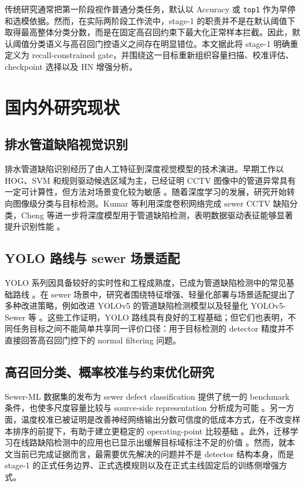 \documentclass[UTF8,openany,12pt]{ctexbook}
\newcommand{\formalmetric}[1]{\texttt{#1}}
\begin{document}
传统研究通常把第一阶段视作普通分类任务，默认以 Accuracy 或 \formalmetric{top1} 作为早停和选模依据。然而，在实际两阶段工作流中，stage-1 的职责并不是在默认阈值下取得最高整体分类分数，而是在固定高召回约束下最大化正常样本拦截。因此，默认阈值分类语义与高召回门控语义之间存在明显错位。本文据此将 stage-1 明确重定义为 recall-constrained gate，并围绕这一目标重新组织容量扫描、校准评估、checkpoint 选择以及 HN 增强分析。

\section{国内外研究现状}
\subsection{排水管道缺陷视觉识别}
排水管道缺陷识别经历了由人工特征到深度视觉模型的技术演进。早期工作以 HOG、SVM 和规则驱动候选区域为主，已经证明 CCTV 图像中的管道异常具有一定可计算性，但方法对场景变化较为敏感 \cite{halfawy2014hogsvm}。随着深度学习的发展，研究开始转向图像级分类与目标检测。Kumar 等利用深度卷积网络完成 sewer CCTV 缺陷分类，Cheng 等进一步将深度模型用于管道缺陷检测，表明数据驱动表征能够显著提升识别性能 \cite{kumar2018cnn,cheng2018deep}。

\subsection{YOLO 路线与 sewer 场景适配}
YOLO 系列因具备较好的实时性和工程成熟度，已成为管道缺陷检测中的常见基础路线 \cite{redmon2016yolo}。在 sewer 场景中，研究者围绕特征增强、轻量化部署与场景适配提出了多种改进策略，例如改进 YOLOv5 的管道缺陷检测模型以及轻量化 YOLOv5-Sewer 等 \cite{wang2023improvedyolov5,zhao2024yolov5sewer}。这些工作证明，YOLO 路线具有良好的工程基础；但它们也表明，不同任务目标之间不能简单共享同一评价口径：用于目标检测的 detector 精度并不直接回答高召回门控下的 normal filtering 问题。

\subsection{高召回分类、概率校准与约束优化研究}
Sewer-ML 数据集的发布为 sewer defect classification 提供了统一的 benchmark 条件，也使多尺度容量比较与 source-side representation 分析成为可能 \cite{haurum2021sewerml}。另一方面，温度校准已被证明是改善神经网络输出分数可信度的低成本方式，在不改变样本排序的前提下，有助于建立更稳定的 operating-point 比较基础 \cite{guo2017calibration}。此外，迁移学习在线路缺陷检测中的应用也已显示出缓解目标域标注不足的价值 \cite{situ2023transfer}。然而，就本文当前已完成证据而言，最需要优先解决的问题并不是 detector 结构本身，而是 stage-1 的正式任务边界、正式选模规则以及在正式主线固定后的训练侧增强方式。
\end{document}
